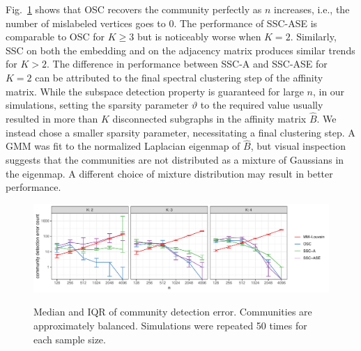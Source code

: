 \documentclass[12pt]{article}
\begin{document}
Fig.~\ref{fig:clust_err_ct_sim} shows that OSC recovers the community
perfectly as $n$ increases, i.e., the number of mislabeled vertices
goes to $0$. The performance of SSC-ASE is comparable to OSC for $K
\geq 3$ but is noticeably worse when $K = 2$. Similarly, SSC on both the embedding and on the
adjacency matrix produces similar trends for \(K > 2\). The difference
in performance between SSC-A and SSC-ASE for \(K = 2\) can be attributed to the final spectral
clustering step of the affinity matrix. While the subspace detection
property is guaranteed for large $n$, in our simulations, setting the
sparsity parameter $\vartheta$ to the required value usually resulted
in more than $K$ disconnected subgraphs in the affinity matrix
$\hat{B}$.  
We instead chose a smaller sparsity parameter, 
necessitating a final clustering step. 
A GMM was fit to the normalized Laplacian eigenmap of $\hat{B}$,
but visual inspection suggests that the communities are not
distributed as a mixture of Gaussians in the eigenmap. 
A different choice of mixture distribution may result in better performance. 

\begin{figure}[tp]
{\centering \includegraphics{summary_files/figure-latex/clust_err_ct_sim-1}
}

\caption{Median and IQR of community detection error. Communities are approximately balanced. Simulations were repeated 50 times for each sample size.}\label{fig:clust_err_ct_sim}
\end{figure}
\end{document}
